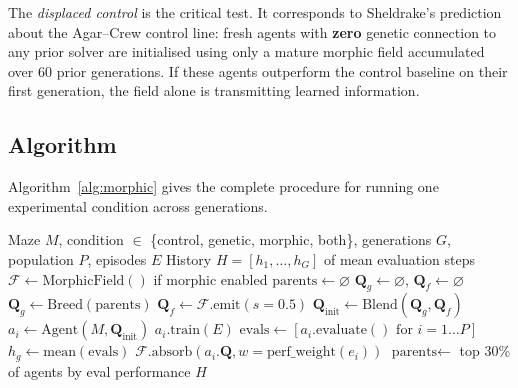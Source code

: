 \documentclass[twoside,11pt]{article}
\begin{document}
The \emph{displaced control} is the critical test.  It corresponds to
Sheldrake's prediction about the Agar--Crew control line: fresh agents with
\textbf{zero} genetic connection to any prior solver are initialised using
only a mature morphic field accumulated over 60 prior generations.  If these
agents outperform the control baseline on their first generation, the field
alone is transmitting learned information.

\subsection{Algorithm}
\label{sec:architecture:algorithm}

Algorithm~\ref{alg:morphic} gives the complete procedure for running one
experimental condition across generations.

\begin{algorithm}[ht]
\caption{Run one experimental condition}
\label{alg:morphic}
\begin{algorithmic}[1]
\Require Maze $M$, condition $\in$ \{control, genetic, morphic, both\},
         generations $G$, population $P$, episodes $E$
\Ensure History $H = [h_1, \ldots, h_G]$ of mean evaluation steps
\State $\mathcal{F} \gets \text{MorphicField}()$ if morphic enabled
\State $\text{parents} \gets \varnothing$
        \State $\mathbf{Q}_g \gets \varnothing$, $\mathbf{Q}_f \gets \varnothing$
            \State $\mathbf{Q}_g \gets \text{Breed}(\text{parents})$
        \EndIf
            \State $\mathbf{Q}_f \gets \mathcal{F}.\text{emit}(s=0.5)$
        \EndIf
        \State $\mathbf{Q}_{\text{init}} \gets \text{Blend}(\mathbf{Q}_g, \mathbf{Q}_f)$
        \State $a_i \gets \text{Agent}(M, \mathbf{Q}_{\text{init}})$
        \State $a_i.\text{train}(E)$
    \EndFor
    \State $\text{evals} \gets [a_i.\text{evaluate}() \text{ for } i = 1 \ldots P]$
    \State $h_g \gets \text{mean}(\text{evals})$
            \State $\mathcal{F}.\text{absorb}(a_i.\mathbf{Q}, w = \text{perf\_weight}(e_i))$
        \EndFor
    \EndIf
        \State $\text{parents} \gets$ top 30\% of agents by eval performance
    \EndIf
\EndFor
\State \Return $H$
\end{algorithmic}
\end{algorithm}
\end{document}
